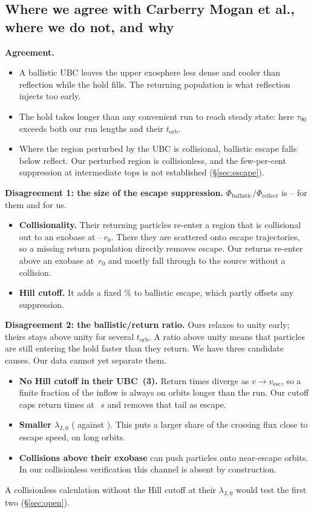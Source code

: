 \documentclass[10pt]{article}
\newcommand{\para}[1]{\textbf{#1}\hspace{0.5em}}
\newcommand{\torb}{t_\mathrm{orb}}
\newcommand{\tauf}{\tau_{90}}
\begin{document}
\subsection{Where we agree with Carberry Mogan et al., where we do not, and why}

\para{Agreement.}
\begin{itemize}
  \item A ballistic UBC leaves the upper exosphere less dense and cooler than reflection while the hold fills. The returning population is what reflection injects too early.
  \item The hold takes longer than any convenient run to reach steady state: here $\tauf$ exceeds both our run lengths and their $\torb$.
  \item Where the region perturbed by the UBC is collisional, ballistic escape falls below reflect. Our perturbed region is collisionless, and the few-per-cent suppression at intermediate tops is not established (\S\ref{sec:escape}).
\end{itemize}

\para{Disagreement 1: the size of the escape suppression.} $\Phi_\mathrm{ballistic}/\Phi_\mathrm{reflect}$ is \pPhiRatioStart{}–\pPhiRatioEnd{} for them and \sweepPhiRatioRange{} for us.
\begin{itemize}
  \item \textbf{Collisionality.} Their returning particles re-enter a region that is collisional out to an exobase at \pExoKnZeroReflect{}–\pExoKnReflect{}\,$r_0$. There they are scattered onto escape trajectories, so a missing return population directly removes escape. Our returns re-enter above an exobase at \exoRReflectKn{}\,$r_0$ and mostly fall through to the source without a collision.
  \item \textbf{Hill cutoff.} It adds a fixed \anBallisticExcess{}\% to ballistic escape, which partly offsets any suppression.
\end{itemize}

\para{Disagreement 2: the ballistic/return ratio.} Ours relaxes to unity early; theirs stays above unity for several $\torb$. A ratio above unity means that particles are still entering the hold faster than they return. We have three candidate causes. Our data cannot yet separate them.
\begin{itemize}
  \item \textbf{No Hill cutoff in their UBC~(3).} Return times diverge as $v \to v_\mathrm{esc}$, so a finite fraction of the inflow is always on orbits longer than the run. Our cutoff caps return times at \tReturnMax{}~s and removes that tail as escape.
  \item \textbf{Smaller $\lambda_{\mathrm{J},0}$} (\pLambdaZero{} against \oLambdaZero{}). This puts a larger share of the crossing flux close to escape speed, on long orbits.
  \item \textbf{Collisions above their exobase} can push particles onto near-escape orbits. In our collisionless verification this channel is absent by construction.
\end{itemize}
A collisionless calculation without the Hill cutoff at their $\lambda_{\mathrm{J},0}$ would test the first two (\S\ref{sec:open}).
\end{document}
